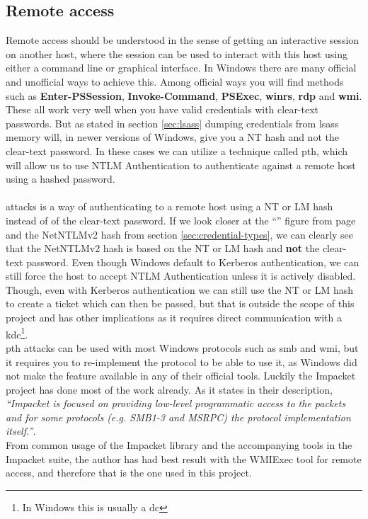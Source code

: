 \documentclass{article}
\begin{document}
\subsection{Remote access}
\label{sec:remote-access}
Remote access should be understood in the sense of getting an interactive session on another host, where the session can be used to interact with this host using either a command line or graphical interface. In Windows there are many official and unofficial ways to achieve this. Among official ways you will find methods such as \textbf{Enter-PSSession}, \textbf{Invoke-Command}, \textbf{PSExec}, \textbf{\gls{winrs}}, \textbf{\gls{rdp}} and \textbf{\gls{wmi}}\cite{url:stackoverflow:windows-remote-commands}. These all work very well when you have valid credentials with clear-text passwords. But as stated in section \ref{sec:lsass} dumping credentials from \gls{lsass} memory will, in newer versions of Windows, give you a NT hash and not the clear-text password. In these cases we can utilize a technique called \gls{pth}, which will allow us to use NTLM Authentication to authenticate against a remote host using a hashed password.
\paragraph{}
 attacks is a way of authenticating to a remote host using a NT or LM hash instead of of the clear-text password. If we look closer at the \enquote{} figure from page \pageref{fig:ntlm-authenticate-message} and the NetNTLMv2 hash from section \ref{sec:credential-types}, we can clearly see that the NetNTLMv2 hash is based on the NT or LM hash and \textbf{not} the clear-text password. Even though Windows default to Kerberos authentication, we can still force the host to accept NTLM Authentication unless it is actively disabled. Though, even with Kerberos authentication we can still use the NT or LM hash to create a ticket which can then be passed, but that is outside the scope of this project and has other implications as it requires direct communication with a \gls{kdc}\footnote{In Windows this is usually a \gls{dc}}.
\\
\gls{pth} attacks can be used with most Windows protocols such as \gls{smb} and \gls{wmi}, but it requires you to re-implement the protocol to be able to use it, as Windows did not make the feature available in any of their official tools. Luckily the Impacket project has done most of the work already. As it states in their description, \emph{\enquote{Impacket is focused on providing low-level programmatic access to the packets and for some protocols (e.g. SMB1-3 and MSRPC) the protocol implementation itself.}}\cite{url:impacket:github}.
\\
From common usage of the Impacket library and the accompanying tools in the Impacket suite, the author has had best result with the WMIExec tool for remote access, and therefore that is the one used in this project.
\end{document}

